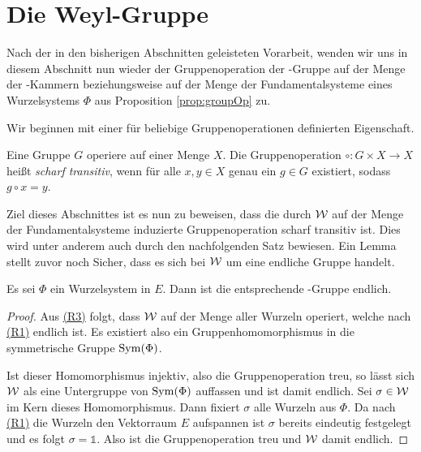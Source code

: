 \section{Die Weyl-Gruppe}
\label{sec:weylgroup}

Nach der in den bisherigen Abschnitten geleisteten Vorarbeit, wenden wir uns in diesem Abschnitt nun wieder der Gruppenoperation der \weyl\hyp{}Gruppe auf der Menge der \weyl\hyp{}Kammern beziehungsweise auf der Menge der Fundamentalsysteme eines Wurzelsystems $\Phi$ aus Proposition \ref{prop:groupOp} zu.

Wir beginnen mit einer für beliebige Gruppenoperationen definierten Eigenschaft.

\begin{defn}
  Eine Gruppe $G$ operiere auf einer Menge $X$.
  Die Gruppenoperation $\circ \colon G \times X \to X$ heißt \emph{scharf transitiv}, wenn für alle $x,y \in X$ genau ein $g \in G$ existiert, sodass $g \circ x = y$. 
\end{defn}

Ziel dieses Abschnittes ist es nun zu beweisen, dass die durch $\mathcal{W}$ auf der Menge der Fundamentalsysteme induzierte Gruppenoperation scharf transitiv ist.
Dies wird unter anderem auch durch den nachfolgenden Satz bewiesen.
Ein Lemma stellt zuvor noch Sicher, dass es sich bei $\mathcal{W}$ um eine endliche Gruppe handelt.

\begin{lem}
  \label{lem:weylFinite}
  Es sei $\Phi$ ein Wurzelsystem in $E$. Dann ist die entsprechende \weyl\hyp{}Gruppe endlich. 
\end{lem}

\begin{proof}
  Aus \hyperref[it:R3]{(R3)} folgt, dass $\mathcal{W}$ auf der Menge aller Wurzeln operiert, welche nach \hyperref[it:R1]{(R1)} endlich ist.
  Es existiert also ein Gruppenhomomorphismus in die symmetrische Gruppe $\operatorname{Sym}(\Phi)$.

  Ist dieser Homomorphismus injektiv, also die Gruppenoperation treu, so lässt sich $\mathcal{W}$ als eine Untergruppe von $\operatorname{Sym}(\Phi)$ auffassen und ist damit endlich.
  Sei $\sigma \in \mathcal{W}$ im Kern dieses Homomorphismus.
  Dann fixiert $\sigma$ alle Wurzeln aus $\Phi$.
  Da nach \hyperref[it:R1]{(R1)} die Wurzeln den Vektorraum $E$ aufspannen ist $\sigma$ bereits eindeutig festgelegt und es folgt $\sigma = \mathds{1}$.
  Also ist die Gruppenoperation treu und $\mathcal{W}$ damit endlich.
\end{proof}


